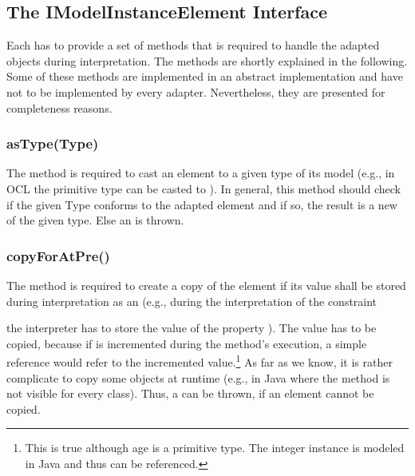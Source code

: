\subsection{The IModelInstanceElement Interface}

Each  has to provide a set of methods that is
required to handle the adapted objects during interpretation. The methods are
shortly explained in the following. Some of these methods are implemented in an
abstract  implementation and have not to be
implemented by every adapter. Nevertheless, they are presented for completeness
reasons.

\subsubsection{asType(Type)}

The method  is required to cast an element to a given type
of its model (e.g., in OCL the primitive type  can be casted to
). In general, this method should check if the given Type conforms
to the adapted element and if so, the result is a new
 of the given type. Else an
 is thrown.

\subsubsection{copyForAtPre()} 

The method  is required to create a copy of the element if 
its value shall be stored during interpretation as an 
(e.g., during the interpretation of the constraint


the interpreter has to store the value of the property ). The value
has to be copied, because if  is incremented during the method's
execution, a simple reference would refer to the incremented
value.\footnote{This is true although age is a primitive type. The integer
instance is modeled in Java and thus can be referenced.} As far as we know, it 
is rather complicate to copy some objects at runtime (e.g., in Java where the 
 method is not visible for every class). Thus, a 
 can be thrown, if an element cannot be copied.


